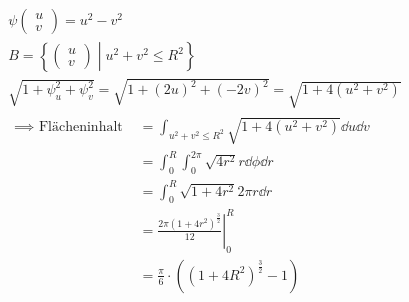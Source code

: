 \begin{bsp*}
	\begin{gather*}
		\psi\begin{pmatrix} u \\ v \end{pmatrix} = u^2 - v^2 \\
		B = \left\{ \begin{pmatrix} u \\ v \end{pmatrix} \middle| u^2 + v^2 \leq R^2 \right\} \\
		\sqrt{1 + \psi_u^2 + \psi_v^2} = \sqrt{1 + (2u)^2 + (-2v)^2} = \sqrt{1 + 4(u^2 + v^2)} \\
		\begin{split}
			\implies \text{ Flächeninhalt }
				&= \int_{u^2 + v^2 \leq R^2} \sqrt{1 + 4(u^2 + v^2)} \dd u \dd v \\
				&= \int_0^R \int_0^{2\pi} \sqrt{4r^2} r \dd \phi \dd r \\
				&= \int_0^R \sqrt{1+4r^2} 2\pi r \dd r \\
				&= \left. \frac{2\pi(1+4r^2)^{\frac{3}{2}}}{12} \right|_0^R \\
				&= \frac{\pi}{6} \cdot((1+4R^2)^{\frac{3}{2}} - 1)
		\end{split}
	\end{gather*}
\end{bsp*}
